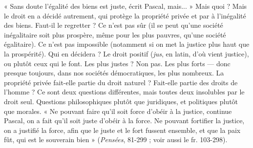 {« Sans doute l'égalité des biens est juste, écrit Pascal, mais... » Mais quoi ?
Mais le droit en a décidé autrement, qui protège la propriété privée et par à
l’inégalité des biens. Faut-il le regretter ? Ce n’est pas sûr (il se peut qu’une
société inégalitaire soit plus prospère, même pour les plus pauvres, qu’une
société égalitaire). Ce n’est pas impossible (notamment si on met la justice plus
haut que la prospérité). Qui en décidera ? Le droit positif ({\it jus}, en latin, d’où
vient justice), ou plutôt ceux qui le font. Les plus justes ? Non pas. Les plus
forts — donc presque toujours, dans nos sociétés démocratiques, les plus nombreux.
La propriété privée fait-elle partie du droit naturel ? Fait-elle partie des
droits de l’homme ? Ce sont deux questions différentes, mais toutes deux insolubles
par le droit seul. Questions philosophiques plutôt que juridiques, et politiques
plutôt que morales. « Ne pouvant faire qu’il soit force d’obéir à la justice,
continue Pascal, on a fait qu’il soit juste d’obéir à la force. Ne pouvant fortifier
la justice, on a justifié la force, afin que le juste et le fort fussent ensemble, et
que la paix fût, qui est le souverain bien » ({\it Pensées}, 81-299 ; voir aussi le
fr. 103-298).

}
